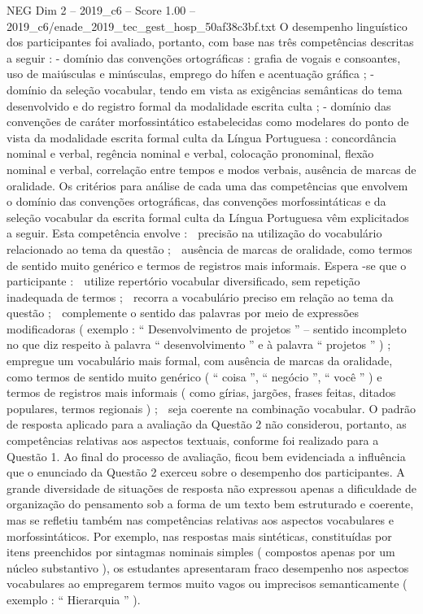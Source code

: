 \begin{textsample}{NEG Dim 2 – 2019\_c6 – Score 1.00 – 2019\_c6/enade\_2019\_tec\_gest\_hosp\_50af38c3bf.txt}
O desempenho linguístico dos participantes foi avaliado, portanto, com base nas três competências descritas a seguir : - domínio das convenções ortográficas : grafia de vogais e consoantes, uso de maiúsculas e minúsculas, emprego do hífen e acentuação gráfica ; - domínio da seleção vocabular, tendo em vista as exigências semânticas do tema desenvolvido e do registro formal da modalidade escrita culta ; - domínio das convenções de caráter morfossintático estabelecidas como modelares do ponto de vista da modalidade escrita formal culta da Língua Portuguesa : concordância nominal e verbal, regência nominal e verbal, colocação pronominal, flexão nominal e verbal, correlação entre tempos e modos verbais, ausência de marcas de oralidade.
Os critérios para análise de cada uma das competências que envolvem o domínio das convenções ortográficas, das convenções morfossintáticas e da seleção vocabular da escrita formal culta da Língua Portuguesa vêm explicitados a seguir.
Esta competência envolve :  precisão na utilização do vocabulário relacionado ao tema da questão ;  ausência de marcas de oralidade, como termos de sentido muito genérico e termos de registros mais informais.
Espera -se que o participante :  utilize repertório vocabular diversificado, sem repetição inadequada de termos ;  recorra a vocabulário preciso em relação ao tema da questão ;  complemente o sentido das palavras por meio de expressões modificadoras ( exemplo : “ Desenvolvimento de projetos ” – sentido incompleto no que diz respeito à palavra “ desenvolvimento ” e à palavra “ projetos ” ) ;  empregue um vocabulário mais formal, com ausência de marcas da oralidade, como termos de sentido muito genérico ( “ coisa ”, “ negócio ”, “ você ” ) e termos de registros mais informais ( como gírias, jargões, frases feitas, ditados populares, termos regionais ) ;  seja coerente na combinação vocabular.
O padrão de resposta aplicado para a avaliação da Questão 2 não considerou, portanto, as competências relativas aos aspectos textuais, conforme foi realizado para a Questão 1.
Ao final do processo de avaliação, ficou bem evidenciada a influência que o enunciado da Questão 2 exerceu sobre o desempenho dos participantes.
A grande diversidade de situações de resposta não expressou apenas a dificuldade de organização do pensamento sob a forma de um texto bem estruturado e coerente, mas se refletiu também nas competências relativas aos aspectos vocabulares e morfossintáticos.
Por exemplo, nas respostas mais sintéticas, constituídas por itens preenchidos por sintagmas nominais simples ( compostos apenas por um núcleo substantivo ), os estudantes apresentaram fraco desempenho nos aspectos vocabulares ao empregarem termos muito vagos ou imprecisos semanticamente ( exemplo : “ Hierarquia ” ).

\end{textsample}
